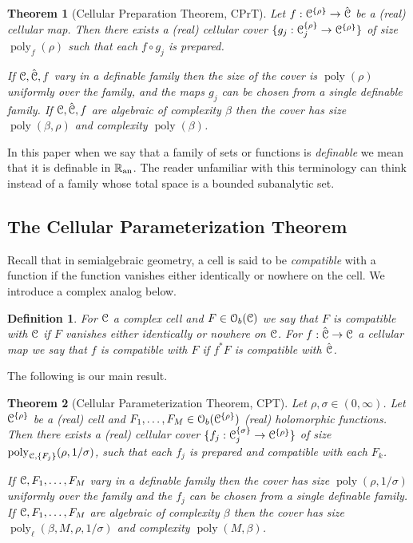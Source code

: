 \documentclass[reqno]{amsart}
\newtheorem{Thm}{Theorem}{\bfseries}{\itshape}
\newtheorem{Def}[Cor]{Definition}{\bfseries}{\rmfamily}
\renewcommand\~[1]{\widetilde{#1}}
\def\poly{\operatorname{poly}} \def\J{\operatorname{J}}
\def\cO{{\mathcal O}}
\def\an{{\text{an}}}
\def\he#1{{\{#1\}}}
\def\hrho{{\he\rho}}
\def\hsigma{{\he\sigma}}
\begin{document}
\begin{Thm}[Cellular Preparation Theorem, CPrT]\label{thm:cprt}
  Let $f:\cC^\hrho\to\hat\cC$ be a (real) cellular map. Then there
  exists a (real) cellular cover $\{g_j:\cC_j^\hrho\to\cC^\hrho\}$ of
  size $\poly_f(\rho)$ such that each $f\circ g_j$ is prepared.

  If ${\mathcal C},\hat{{\mathcal C}},f$ vary in a definable family then the size of the
  cover is $\poly(\rho)$ uniformly over the family, and the maps $g_j$
  can be chosen from a single definable family.  If ${\mathcal C},\hat{{\mathcal C}},f$
  are algebraic of complexity $\beta$ then the cover has size
  $\poly(\beta,\rho)$ and complexity $\poly(\beta)$.
\end{Thm}

In this paper when we say that a family of sets or functions is
\emph{definable} we mean that it is definable in $\R_\an$. The reader
unfamiliar with this terminology can think instead of a family whose
total space is a bounded subanalytic set.

\subsection{The Cellular Parameterization Theorem}

Recall that in semialgebraic geometry, a cell is said to be
\emph{compatible} with a function if the function vanishes either
identically or nowhere on the cell. We introduce a complex analog
below.

\begin{Def}
  For ${\mathcal C}$ a complex cell and $F\in\cO_b(\cC)$ we say that $F$ is
  \emph{compatible} with ${\mathcal C}$ if $F$ vanishes either identically or
  nowhere on ${\mathcal C}$. For $f:\hat{{\mathcal C}}\to{\mathcal C}$ a cellular map we say that
  $f$ is compatible with $F$ if $f^*F$ is compatible with $\hat{{\mathcal C}}$.
\end{Def}

The following is our main result.

\begin{Thm}[Cellular Parameterization Theorem, CPT]\label{thm:cpt}
  Let $\rho,\sigma\in(0,\infty)$. Let $\cC^\hrho$ be a (real) cell and
  $F_1,\ldots,F_M\in\cO_b(\cC^\hrho)$ (real) holomorphic
  functions. Then there exists a (real) cellular cover
  $\{f_j:\cC^\hsigma_j\to\cC^\hrho\}$ of size
  $\poly_{\cC,\{F_j\}}(\rho,1/\sigma)$, such that each $f_j$ is
  prepared and compatible with each $F_k$.

  If ${\mathcal C},F_1,\ldots,F_M$ vary in a definable family then the cover
  has size $\poly(\rho,1/\sigma)$ uniformly over the family and the
  $f_j$ can be chosen from a single definable family. If
  ${\mathcal C},F_1,\ldots,F_M$ are algebraic of complexity $\beta$ then the
  cover has size $\poly_\ell(\beta,M,\rho,1/\sigma)$ and complexity
  $\poly(M,\beta)$.
\end{Thm}
\end{document}
